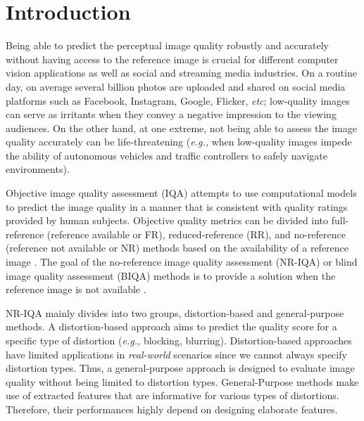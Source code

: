 \documentclass[10pt,twocolumn,letterpaper]{article}
\begin{document}
\vspace{-0.5 cm}
\section{Introduction}
Being able to predict the perceptual image quality robustly and accurately  without having access to the   reference image is crucial for different computer vision applications as well as social and streaming media industries.
On a routine day, on average  several   billion photos are uploaded and shared on social media platforms such as Facebook, Instagram, Google, Flicker, \textit{etc}; low-quality images can serve as irritants when they convey a negative impression to the viewing audiences.
On the other hand, at one extreme, not being able to assess the image  quality accurately can be life-threatening (\textit{e.g.,} when low-quality images impede the ability of autonomous vehicles \cite{lou2019veri,chiu2020assessing} and traffic controllers \cite{zhu2016traffic} to safely navigate environments). 

 
Objective image quality assessment (IQA) attempts to use computational models to predict the image quality  in a manner that is consistent with quality ratings provided by human subjects.
Objective quality metrics can be divided into full-reference (reference available or FR), reduced-reference (RR), and no-reference (reference not available or NR) methods based on the availability of a reference image \cite{wang2006modern}.
The goal of the no-reference image quality assessment (NR-IQA) or blind image quality assessment (BIQA) methods is to provide a solution when the reference image is not available \cite{saad2012blind,mittal2012no,xue2013learning,zhang2015feature}.


NR-IQA  mainly divides into two groups, distortion-based and general-purpose methods. 
A distortion-based approach aims to predict the quality score for a specific type of distortion (\textit{e.g.,} blocking, blurring).
Distortion-based approaches have limited applications in \textit{real-world} scenarios since we cannot always specify distortion types.
Thus, a general-purpose approach is designed to evaluate image quality without being limited to distortion types.
General-Purpose methods make use of extracted features that are informative for various types of distortions.
Therefore, their performances highly depend on designing elaborate features. 
\end{document}
